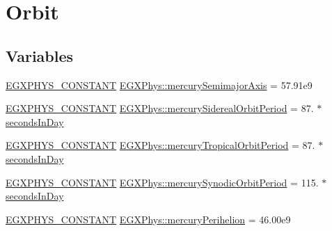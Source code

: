 \hypertarget{group___e_g_x_phys-_constants-_astrophysics-_solar_system-_mercury-_orbit}{}\section{Orbit}
\label{group___e_g_x_phys-_constants-_astrophysics-_solar_system-_mercury-_orbit}
\subsection*{Variables}
\begin{DoxyCompactItemize}
\item 
\mbox{\hyperlink{group___e_g_x_phys-_constants-_macros_ga76980d288494ce1714c9ac68a95ba702}{E\+G\+X\+P\+H\+Y\+S\+\_\+\+C\+O\+N\+S\+T\+A\+NT}} \mbox{\hyperlink{group___e_g_x_phys-_constants-_astrophysics-_solar_system-_mercury-_orbit_ga595bacd615f9a5a0d92f53f6e7e01f04}{E\+G\+X\+Phys\+::mercury\+Semimajor\+Axis}} = 57.\+91e9
\item 
\mbox{\hyperlink{group___e_g_x_phys-_constants-_macros_ga76980d288494ce1714c9ac68a95ba702}{E\+G\+X\+P\+H\+Y\+S\+\_\+\+C\+O\+N\+S\+T\+A\+NT}} \mbox{\hyperlink{group___e_g_x_phys-_constants-_astrophysics-_solar_system-_mercury-_orbit_gadd4d21698bc8b7f0780629e95cea5f52}{E\+G\+X\+Phys\+::mercury\+Sidereal\+Orbit\+Period}} = 87. $\ast$ \mbox{\hyperlink{namespace_e_g_x_phys_a93d2a00d75411b58cbf63ab3fd1f8bc2}{seconds\+In\+Day}}
\item 
\mbox{\hyperlink{group___e_g_x_phys-_constants-_macros_ga76980d288494ce1714c9ac68a95ba702}{E\+G\+X\+P\+H\+Y\+S\+\_\+\+C\+O\+N\+S\+T\+A\+NT}} \mbox{\hyperlink{group___e_g_x_phys-_constants-_astrophysics-_solar_system-_mercury-_orbit_ga99b925409a2844db94dcfc8ceae5037a}{E\+G\+X\+Phys\+::mercury\+Tropical\+Orbit\+Period}} = 87. $\ast$ \mbox{\hyperlink{namespace_e_g_x_phys_a93d2a00d75411b58cbf63ab3fd1f8bc2}{seconds\+In\+Day}}
\item 
\mbox{\hyperlink{group___e_g_x_phys-_constants-_macros_ga76980d288494ce1714c9ac68a95ba702}{E\+G\+X\+P\+H\+Y\+S\+\_\+\+C\+O\+N\+S\+T\+A\+NT}} \mbox{\hyperlink{group___e_g_x_phys-_constants-_astrophysics-_solar_system-_mercury-_orbit_gaf0cbddbe7b55b40ccf50b3ba7747ba52}{E\+G\+X\+Phys\+::mercury\+Synodic\+Orbit\+Period}} = 115. $\ast$ \mbox{\hyperlink{namespace_e_g_x_phys_a93d2a00d75411b58cbf63ab3fd1f8bc2}{seconds\+In\+Day}}
\item 
\mbox{\hyperlink{group___e_g_x_phys-_constants-_macros_ga76980d288494ce1714c9ac68a95ba702}{E\+G\+X\+P\+H\+Y\+S\+\_\+\+C\+O\+N\+S\+T\+A\+NT}} \mbox{\hyperlink{group___e_g_x_phys-_constants-_astrophysics-_solar_system-_mercury-_orbit_ga6aff57e13acffaffc3cfe97694da2363}{E\+G\+X\+Phys\+::mercury\+Perihelion}} = 46.\+00e9

\end{DoxyCompactItemize}
